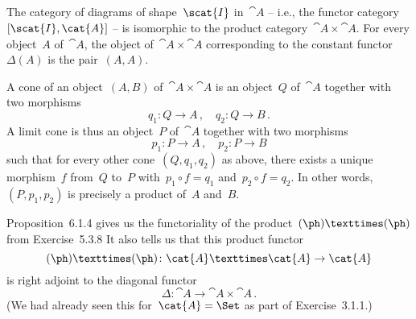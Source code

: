 \subsection{}

The category of diagrams of shape~$\scat{I}$ in~$\cat{A}$ -- i.e., the functor category~$[\scat{I}, \cat{A}]$ -- is isomorphic to the product category~$\cat{A} × \cat{A}$.
For every object~$A$ of~$\cat{A}$, the object of~$\cat{A} × \cat{A}$ corresponding to the constant functor~$Δ(A)$ is the pair~$(A, A)$.

A cone of an object~$(A, B)$ of~$\cat{A} × \cat{A}$ is an object~$Q$ of~$\cat{A}$ together with two morphisms
\[
	q_1 \colon Q \to A \,,
	\quad
	q_2 \colon Q \to B \,.
\]
A limit cone is thus an object~$P$ of~$\cat{A}$ together with two morphisms
\[
	p_1 \colon P \to A \,,
	\quad
	p_2 \colon P \to B
\]
such that for every other cone~$(Q, q_1, q_2)$ as above, there exists a unique morphism~$f$ from~$Q$ to~$P$ with~$p_1 ∘ f = q_1$ and~$p_2 ∘ f = q_2$.
In other words,~$(P, p_1, p_2)$ is precisely a product of~$A$ and~$B$.

Proposition~6.1.4 gives us the functoriality of the product~$(\ph) × (\ph)$ from Exercise~5.3.8
It also tells us that this product functor
\[
	(\ph) × (\ph) \colon \cat{A} × \cat{A} \to \cat{A}
\]
is right adjoint to the diagonal functor
\[
	Δ \colon \cat{A} \to \cat{A} × \cat{A} \,.
\]
(We had already seen this for~$\cat{A} = \Set$ as part of Exercise~3.1.1.)
